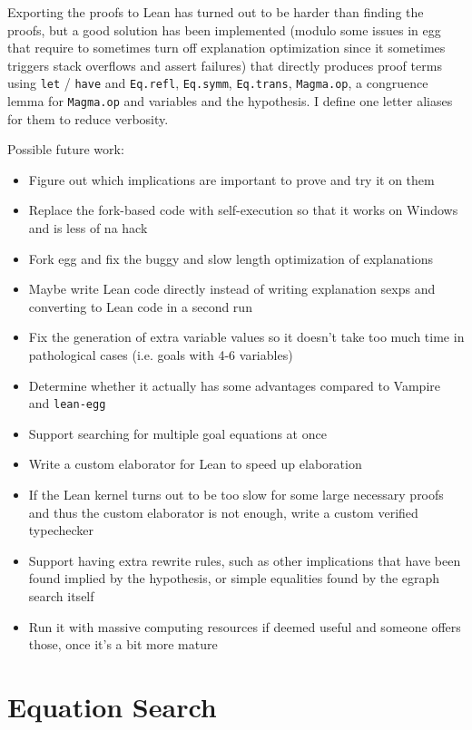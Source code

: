 Exporting the proofs to Lean has turned out to be harder than finding the proofs, but a good solution has been implemented (modulo some issues in egg that require to sometimes turn off explanation optimization since it sometimes triggers stack overflows and assert failures) that directly produces proof terms using \texttt{let} / \texttt{have} and \texttt{Eq.refl}, \texttt{Eq.symm}, \texttt{Eq.trans}, \texttt{Magma.op}, a congruence lemma for \texttt{Magma.op} and variables and the hypothesis. I define one letter aliases for them to reduce verbosity.

Possible future work:

\begin{itemize}
	\item Figure out which implications are important to prove and try it on them
	\item Replace the fork-based code with self-execution so that it works on Windows and is less of na hack
	\item Fork egg and fix the buggy and slow length optimization of explanations
	\item Maybe write Lean code directly instead of writing explanation sexps and converting to Lean code in a second run
	\item Fix the generation of extra variable values so it doesn't take too much time in pathological cases (i.e. goals with 4-6 variables)
	\item Determine whether it actually has some advantages compared to Vampire and \texttt{lean-egg}
	\item Support searching for multiple goal equations at once
	\item Write a custom elaborator for Lean to speed up elaboration
	\item If the Lean kernel turns out to be too slow for some large necessary proofs and thus the custom elaborator is not enough, write a custom verified typechecker
	\item Support having extra rewrite rules, such as other implications that have been found implied by the hypothesis, or simple equalities found by the egraph search itself
	\item Run it with massive computing resources if deemed useful and someone offers those, once it's a bit more mature
\end{itemize}


\chapter{Equation Search}\label{equation-search-chapter}


